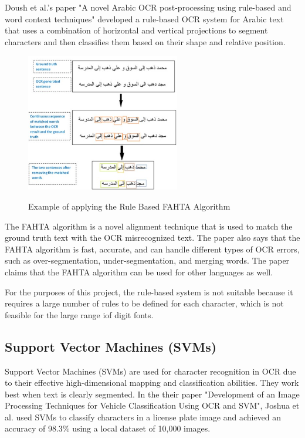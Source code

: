 Doush et al.'s paper "A novel Arabic OCR post-processing using rule-based and word context techniques" developed a rule-based OCR system for Arabic text that uses a combination of horizontal and vertical projections to segment characters and then classifies them based on their shape and relative position. \cite{doushNovelArabicOCR2018}



\begin{figure}[ht]
    \centering
    \includegraphics[width=0.6\textwidth]{Figures/RB_Doush.jpg}
    \caption[Example of applying the Rule Based FAHTA Algorithm]{Example of applying the Rule Based FAHTA Algorithm}\cite{doushNovelArabicOCR2018}
    \label{fig:Doush Rule Based OCR Paper}
\end{figure}

The FAHTA algorithm is a novel alignment technique that is used to match the ground truth text with the OCR misrecognized text. The paper also says that the FAHTA algorithm is fast, accurate, and can handle different types of OCR errors, such as over-segmentation, under-segmentation, and merging words. The paper claims that the FAHTA algorithm can be used for other languages as well.


For the purposes of this project, the rule-based system is not suitable because it requires a large number of rules to be defined for each character, which is not feasible for the large range iof digit fonts.


\newpage

\subsection{Support Vector Machines (SVMs)}

Support Vector Machines (SVMs) are used for character recognition in OCR due to their effective high-dimensional mapping and classification abilities. They work best when text is clearly segmented. In the their paper "Development of an Image Processing Techniques for Vehicle Classification Using OCR and SVM", Joshua et al. used SVMs to classify characters in a license plate image and achieved an accuracy of 98.3\% using a local dataset of 10,000 images.\cite{joshuaDevelopmentImageProcessing2023}

